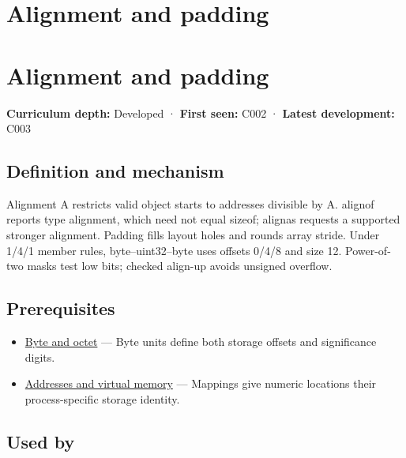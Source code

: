 \hypertarget{appendix-a1f7c53b4742}{}
\section*{Alignment and padding}
\section{Alignment and padding}\label{appendix-a1f7c53b4742-alignment-and-padding}

\textbf{Curriculum depth:} Developed · \textbf{First seen:} C002 · \textbf{Latest development:} C003

\subsection{Definition and mechanism}\label{appendix-a1f7c53b4742-definition-and-mechanism}

Alignment A restricts valid object starts to addresses divisible by A. alignof reports type alignment, which need not equal sizeof; alignas requests a supported stronger alignment. Padding fills layout holes and rounds array stride. Under 1/4/1 member rules, byte--uint32--byte uses offsets 0/4/8 and size 12. Power-of-two masks test low bits; checked align-up avoids unsigned overflow.

\subsection{Prerequisites}\label{appendix-a1f7c53b4742-prerequisites}

\begin{itemize}
\tightlist
\item
  \hyperref[appendix-5bee2df85484]{Byte and octet} --- Byte units define both storage offsets and significance digits.
\item
  \hyperref[appendix-18ee4f913c3c]{Addresses and virtual memory} --- Mappings give numeric locations their process-specific storage identity.
\end{itemize}

\subsection{Used by}\label{appendix-a1f7c53b4742-used-by}

